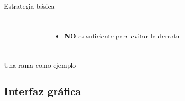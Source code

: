 \documentclass[xcolor = {dvipsnames, table}]{beamer}
\begin{document}
\begin{frame}{Estrategia básica}
  \begin{columns}
    \begin{figure}
      \centering
    \end{figure}
    \begin{itemize}
      \item \textbf{NO} es suficiente para evitar la derrota.
    \end{itemize}
  \end{columns}
\end{frame}

\begin{frame}{Una rama como ejemplo}
  \begin{figure}
    \centering
    \vspace{-1.25cm}
    \scalebox{.375}{}
  \end{figure}
\end{frame}


\subsection{Interfaz gráfica}
\end{document}
